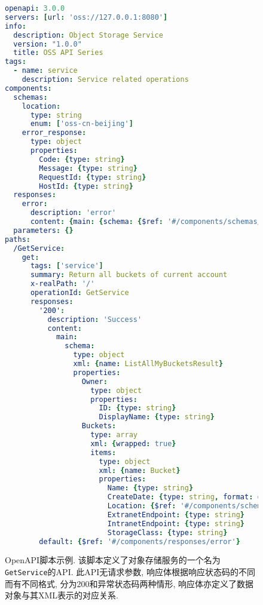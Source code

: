         \begin{figure}[!htb]
            \centering
            \scriptsize
            \tt
            
                \begin{lstlisting}[language=yaml]
openapi: 3.0.0
servers: [url: 'oss://127.0.0.1:8080']
info:
  description: Object Storage Service
  version: "1.0.0"
  title: OSS API Series
tags:
  - name: service
    description: Service related operations
components:
  schemas:
    location:
      type: string
      enum: ['oss-cn-beijing']
    error_response:
      type: object
      properties:
        Code: {type: string}
        Message: {type: string}
        RequestId: {type: string}
        HostId: {type: string}
  responses:
    error:
      description: 'error'
      content: {main: {schema: {$ref: '#/components/schemas/error_response'}}}
  parameters: {}
paths:
  /GetService:
    get:
      tags: ['service']
      summary: Return all buckets of current account
      x-realPath: '/'
      operationId: GetService
      responses:
        '200':
          description: 'Success'
          content:
            main:
              schema:
                type: object
                xml: {name: ListAllMyBucketsResult}
                properties:
                  Owner:
                    type: object
                    properties:
                      ID: {type: string}
                      DisplayName: {type: string}
                  Buckets:
                    type: array
                    xml: {wrapped: true}
                    items:
                      type: object
                      xml: {name: Bucket}
                      properties:
                        Name: {type: string}
                        CreateDate: {type: string, format: date-time}
                        Location: {$ref: '#/components/schemas/location'}
                        ExtranetEndpoint: {type: string}
                        IntranetEndpoint: {type: string}
                        StorageClass: {type: string}
        default: {$ref: '#/components/responses/error'}
                \end{lstlisting}
            
            \caption{OpenAPI脚本示例. 该脚本定义了对象存储服务的一个名为\texttt{GetService}的API. 此API无请求参数, 响应体根据响应状态码的不同而有不同格式, 分为200和异常状态码两种情形, 响应体亦定义了数据对象与其XML表示的对应关系.}
            \label{fig:openapi_example}
        \end{figure}
        
